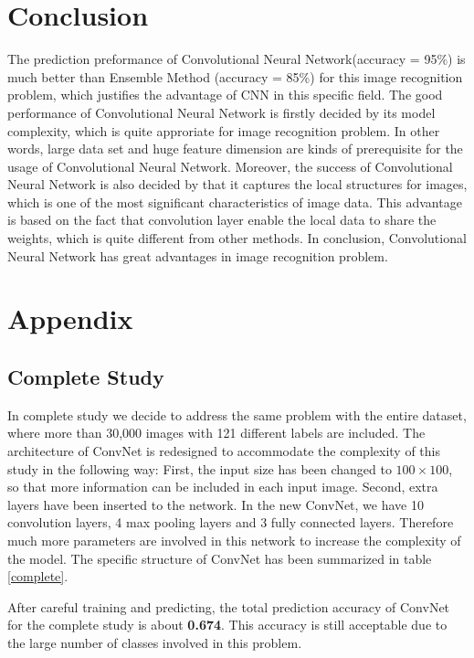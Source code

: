 \documentclass[11pt,oneside,a4paper]{article}
\numberwithin{equation}{section}
\begin{document}
\section{Conclusion}
The prediction preformance of Convolutional Neural Network(accuracy = 95\%) is much better than Ensemble Method (accuracy = 85\%) for this image recognition problem, which justifies the advantage of CNN in this specific field. The good performance of Convolutional Neural Network is firstly decided by its model complexity, which is quite approriate for image recognition problem. In other words, large data set and huge feature dimension are kinds of prerequisite for the usage of Convolutional Neural Network. Moreover, the success of Convolutional Neural Network is also decided by that it captures the local structures for images, which is one of the most significant characteristics of image data. This advantage is based on the fact that convolution layer enable the local data to share the weights, which is quite different from other methods. In conclusion, Convolutional Neural Network has great advantages in image recognition problem.

\printbibliography

\clearpage
\section*{Appendix}
\subsection*{Complete Study}
In complete study we decide to address the same problem with the entire dataset, where more than 30,000 images with 121 different labels are included. The architecture of ConvNet is redesigned to accommodate the complexity of this study in the following way: First, the input size has been changed to $100 \times 100$, so that more information can be included in each input image. Second, extra layers have been inserted to the network. In the new ConvNet, we have 10 convolution layers, 4 max pooling layers and 3 fully connected layers. Therefore much more parameters are involved in this network to increase the complexity of the model. The specific structure of ConvNet has been summarized in table \ref{complete}.

After careful training and predicting, the total prediction accuracy of ConvNet for the complete study is about \textbf{0.674}. This accuracy is still acceptable due to the large number of classes involved in this problem.
\end{document}
